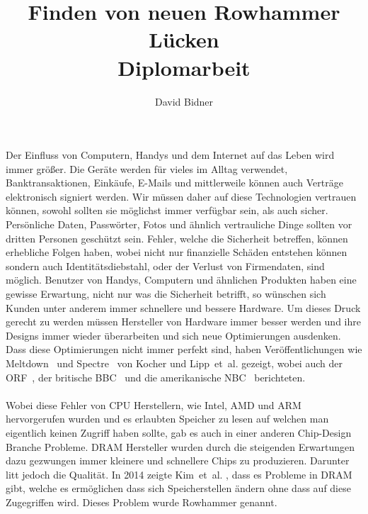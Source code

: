 \documentclass[a4paper]{article}
\title{Finden von neuen Rowhammer Lücken \\ \vspace{+2ex}\small{Diplomarbeit}}
\author{David Bidner}
\date{\vspace{-5ex}}
\newcommand{\etal}{et~al. }
\begin{document}
\maketitle

Der Einfluss von Computern, Handys und dem Internet auf das Leben wird immer größer. Die Geräte werden für vieles im Alltag verwendet, Banktransaktionen, Einkäufe, E-Mails und mittlerweile können auch Verträge elektronisch signiert werden. Wir müssen daher auf diese Technologien vertrauen können, sowohl sollten sie möglichst immer verfügbar sein, als auch sicher. Persönliche Daten, Passwörter, Fotos und ähnlich vertrauliche Dinge sollten vor dritten Personen geschützt sein. Fehler, welche die Sicherheit betreffen, können erhebliche Folgen haben, wobei nicht nur finanzielle Schäden entstehen können sondern auch Identitätsdiebstahl, oder der Verlust von Firmendaten, sind möglich.
Benutzer von Handys, Computern und ähnlichen Produkten haben eine gewisse Erwartung, nicht nur was die Sicherheit betrifft, so wünschen sich Kunden unter anderem immer schnellere und bessere Hardware. Um dieses Druck gerecht zu werden müssen Hersteller von Hardware immer besser werden und ihre Designs immer wieder überarbeiten und sich neue Optimierungen ausdenken. Dass diese Optimierungen nicht immer perfekt sind, haben Veröffentlichungen wie Meltdown~\cite{meltdown} und Spectre~\cite{spectre} von Kocher und Lipp~\etal gezeigt, wobei auch der ORF~\cite{orfmeltdown}, der britische BBC~\cite{bbcmeltdown} und die amerikanische NBC~\cite{nbcmeltdown} berichteten.

\paragraph{}

Wobei diese Fehler von CPU Herstellern, wie Intel, AMD und ARM hervorgerufen wurden und es erlaubten Speicher zu lesen auf welchen man eigentlich keinen Zugriff haben sollte, gab es auch in einer anderen Chip-Design Branche Probleme. DRAM Hersteller wurden durch die steigenden Erwartungen dazu gezwungen immer kleinere und schnellere Chips zu produzieren. Darunter litt jedoch die Qualität. In 2014 zeigte Kim~\etal\cite{rowhammergeneral}, dass es Probleme in DRAM gibt, welche es ermöglichen dass sich Speicherstellen ändern ohne dass auf diese Zugegriffen wird. Dieses Problem wurde Rowhammer genannt.

\paragraph{}
\end{document}
